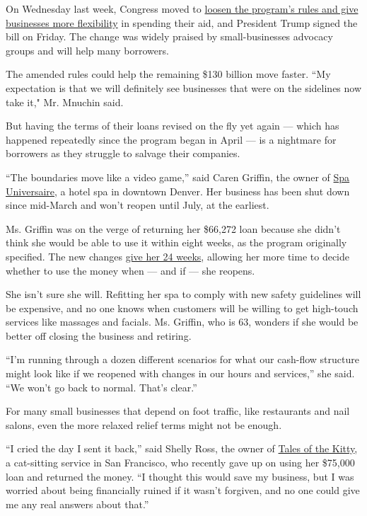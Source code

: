 On Wednesday last week, Congress moved to
\href{https://www.nytimes3xbfgragh.onion/2020/06/03/business/stock-market-today-coronavirus.html\#link-7a1554a7}{loosen
the program's rules and give businesses more flexibility} in spending
their aid, and President Trump signed the bill on Friday. The change was
widely praised by small-businesses advocacy groups and will help many
borrowers.

The amended rules could help the remaining \$130 billion move faster.
``My expectation is that we will definitely see businesses that were on
the sidelines now take it," Mr. Mnuchin said.

But having the terms of their loans revised on the fly yet again ---
which has happened repeatedly since the program began in April --- is a
nightmare for borrowers as they struggle to salvage their companies.

``The boundaries move like a video game,'' said Caren Griffin, the owner
of \href{https://spauniversaire.com/}{Spa Universaire}, a hotel spa in
downtown Denver. Her business has been shut down since mid-March and
won't reopen until July, at the earliest.

Ms. Griffin was on the verge of returning her \$66,272 loan because she
didn't think she would be able to use it within eight weeks, as the
program originally specified. The new changes
\href{https://www.jdsupra.com/legalnews/congress-adds-more-flexibility-to-71347/}{give
her 24 weeks}, allowing her more time to decide whether to use the money
when --- and if --- she reopens.

She isn't sure she will. Refitting her spa to comply with new safety
guidelines will be expensive, and no one knows when customers will be
willing to get high-touch services like massages and facials. Ms.
Griffin, who is 63, wonders if she would be better off closing the
business and retiring.

``I'm running through a dozen different scenarios for what our cash-flow
structure might look like if we reopened with changes in our hours and
services,'' she said. ``We won't go back to normal. That's clear.''

For many small businesses that depend on foot traffic, like restaurants
and nail salons, even the more relaxed relief terms might not be enough.

``I cried the day I sent it back,'' said Shelly Ross, the owner of
\href{https://talesofthekitty.com/}{Tales of the Kitty}, a cat-sitting
service in San Francisco, who recently gave up on using her \$75,000
loan and returned the money. ``I thought this would save my business,
but I was worried about being financially ruined if it wasn't forgiven,
and no one could give me any real answers about that.''

